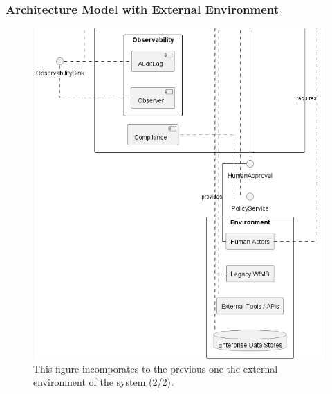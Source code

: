 \subsubsection*{Architecture Model with External Environment}
\begin{figure}[htbp]
  \centering
  \includegraphics[width=0.9\linewidth]{ressources/MAS/diagrams/MAS_arch_and_environment2.png}
  \caption{This figure incomporates to the previous one the external environment of the system (2/2).}
  \label{fig:app-mas-arch-mod}
\end{figure}

\clearpage
